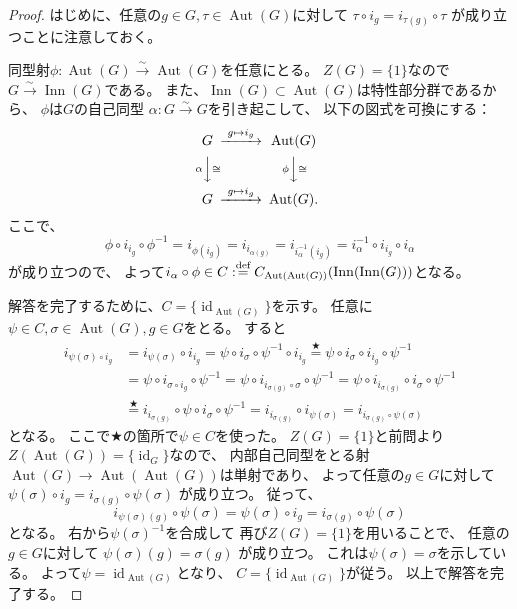 \documentclass[uplatex]{jsreport}
\theoremstyle{definition}
\DeclareMathOperator{\id}{\mathrm{id}}
\DeclareMathOperator{\INN}{\mathrm{Inn}}
\DeclareMathOperator{\Aut}{\mathrm{Aut}}
\newcommand{\dfn}{:\overset{\mbox{{\scriptsize def}}}{=}}
\begin{document}
\begin{proof}
  はじめに、任意の\(g\in G, \tau\in \Aut(G)\)に対して
  \(\tau\circ i_g = i_{\tau(g)}\circ \tau\)
  が成り立つことに注意しておく。

  同型射\(\phi:\Aut(G) \xrightarrow{\sim} \Aut(G)\)を任意にとる。
  \(Z(G) = \{1\}\)なので
  \(G \xrightarrow{\sim} \INN(G)\)である。
  また、\(\INN(G) \subset \Aut(G)\)は特性部分群であるから、
  \(\phi\)は\(G\)の自己同型
  \(\alpha:G\xrightarrow{\sim} G\)を引き起こして、
  以下の図式を可換にする：
  \[
  \begin{CD}
    G @>{g\mapsto i_g}>> \Aut(G) \\
    @V{\alpha}V{\cong}V @V{\phi}V{\cong}V \\
    G @>{g\mapsto i_g}>> \Aut(G).
  \end{CD}
  \]
  ここで、
  \[
  \phi \circ i_{i_g} \circ \phi^{-1}
  = i_{\phi(i_g)}
  = i_{i_{\alpha(g)}}
  = i_{i_{\alpha}^{-1}(i_g)}
  = i_{\alpha}^{-1}\circ i_{i_g} \circ i_{\alpha}
  \]
  が成り立つので、
  よって\(i_{\alpha}\circ \phi\in C\dfn C_{\Aut(\Aut(G))}(\INN(\INN(G)))\)となる。

  解答を完了するために、\(C = \{\id_{\Aut(G)}\}\)を示す。
  任意に\(\psi\in C, \sigma \in \Aut(G), g\in G\)をとる。
  すると
  \begin{align*}
    i_{\psi(\sigma)\circ i_g}
    &= i_{\psi(\sigma)} \circ i_{i_g}
    = \psi \circ i_{\sigma} \circ \psi^{-1} \circ i_{i_g}
    \overset{\bigstar}{=}
    \psi \circ i_{\sigma} \circ i_{i_g} \circ \psi^{-1} \\
    &= \psi \circ i_{\sigma \circ i_g} \circ \psi^{-1}
    = \psi \circ i_{i_{\sigma(g)} \circ \sigma} \circ \psi^{-1}
    = \psi \circ i_{i_{\sigma(g)}} \circ i_{\sigma} \circ \psi^{-1} \\
    &\overset{\bigstar}{=}
    i_{i_{\sigma(g)}} \circ \psi \circ i_{\sigma} \circ \psi^{-1}
    = i_{i_{\sigma(g)}} \circ i_{\psi(\sigma)}
    = i_{i_{\sigma(g)} \circ \psi(\sigma)}
  \end{align*}
  となる。
  ここで\(\bigstar\)の箇所で\(\psi\in C\)を使った。
  \(Z(G) = \{1\}\)と前問より
  \(Z(\Aut(G)) = \{\id_G\}\)なので、
  内部自己同型をとる射
  \(\Aut(G) \to \Aut(\Aut(G))\)は単射であり、
  よって任意の\(g\in G\)に対して
  \(\psi(\sigma) \circ i_g = i_{\sigma(g)} \circ \psi(\sigma)\)
  が成り立つ。
  従って、
  \[
  i_{\psi(\sigma)(g)} \circ \psi(\sigma)
  = \psi(\sigma)\circ i_g
  = i_{\sigma(g)}\circ \psi(\sigma)
  \]
  となる。
  右から\(\psi(\sigma)^{-1}\)を合成して
  再び\(Z(G) = \{1\}\)を用いることで、
  任意の\(g\in G\)に対して
  \(\psi(\sigma)(g) = \sigma(g)\)
  が成り立つ。
  これは\(\psi(\sigma) = \sigma\)を示している。
  よって\(\psi = \id_{\Aut(G)}\)となり、
  \(C = \{\id_{\Aut(G)}\}\)が従う。
  以上で解答を完了する。
\end{proof}
\end{document}
